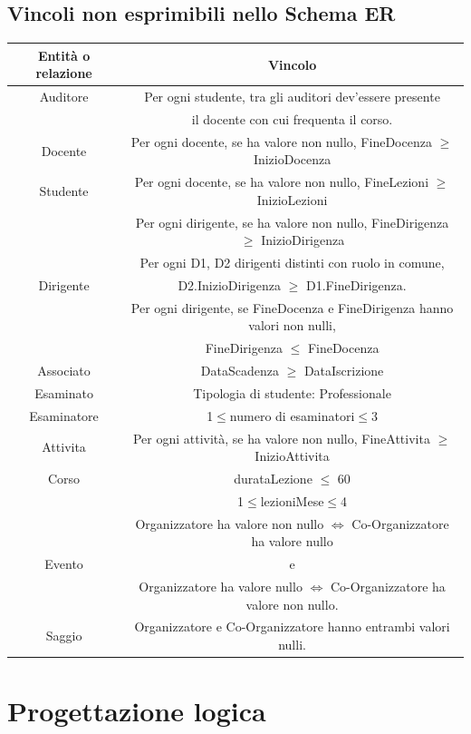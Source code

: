 \documentclass[11pt]{article}
\begin{document}
	\subsection{Vincoli non esprimibili nello Schema ER}
		\begin{tabular}{|c|c|}
			\hline
			\textbf{Entità o relazione} & \textbf{Vincolo}\\
			\hline
			Auditore&Per ogni studente, tra gli auditori dev'essere presente\\
			&il docente con cui frequenta il corso.\\
			\hline
			Docente&Per ogni docente, se ha valore non nullo, FineDocenza $\ge$ InizioDocenza\\
			\hline
			Studente&Per ogni docente, se ha valore non nullo, FineLezioni $\ge$ InizioLezioni\\
			\hline
			&Per ogni dirigente, se ha valore non nullo, FineDirigenza $\ge$ InizioDirigenza\\
			&Per ogni D1, D2 dirigenti distinti con ruolo in comune,\\
			Dirigente&D2.InizioDirigenza $\geq$ D1.FineDirigenza.\\
			&Per ogni dirigente, se FineDocenza e FineDirigenza hanno valori non nulli,\\
			&FineDirigenza $\leq$ FineDocenza\\
			\hline
			Associato&DataScadenza $\ge$ DataIscrizione\\
			\hline
			Esaminato&Tipologia di studente: Professionale\\
			\hline
			Esaminatore&1$\leq$numero di esaminatori$\leq$3\\
			\hline
			Attivita&Per ogni attività, se ha valore non nullo, FineAttivita $\geq$ InizioAttivita\\
			\hline
			Corso&durataLezione $\leq$ 60\\
			&1$\leq$lezioniMese$\leq$4\\
			\hline
			&Organizzatore ha valore non nullo $\Leftrightarrow$ Co-Organizzatore ha valore nullo\\
			Evento&e\\
			&Organizzatore ha valore nullo $\Leftrightarrow$ Co-Organizzatore ha valore non nullo.\\
			\hline
			Saggio&Organizzatore e Co-Organizzatore hanno entrambi valori nulli.\\
			\hline
		\end{tabular}
\section{Progettazione logica}
\end{document}

